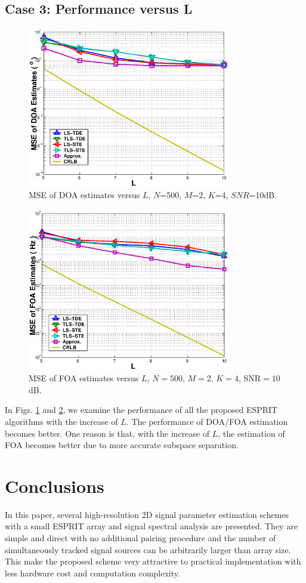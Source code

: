 \documentclass[conference]{IEEEtran}
\begin{document}
\subsection*{Case 3: Performance versus L}
\begin{figure}
\begin{center}
\includegraphics[width=3.5in]{SF_DOAL.eps}
\caption{MSE of DOA estimates versus $L$, $N$=500, $M$=2, $K$=4,
$SNR$=10dB.} \label{SFDOAL}
\end{center}
\end{figure}
\begin{figure}
\begin{center}
\includegraphics[width=3.5in]{SF_FOAL.eps}
\caption{MSE of FOA estimates versus $L$, $N=500$, $M=2$, $K=4$,
$\mbox{SNR}=10$dB.} \label{SFFOAL}
\end{center}
\end{figure}

In Figs. \ref{SFDOAL} and \ref{SFFOAL}, we examine the performance
of all the proposed ESPRIT algorithms with the increase of $L$.
The performance of DOA/FOA estimation becomes better. One reason
is that, with the increase of $L$, the estimation of FOA becomes
better due to more accurate subspace separation.
\section{Conclusions}
In this paper, several high-resolution 2D signal parameter
estimation schemes with a small ESPRIT array and signal spectral
analysis are presented. They are simple and direct with no
additional pairing procedure and the number of simultaneously
tracked signal sources can be arbitrarily larger than array size.
This make the proposed scheme very attractive to practical
implementation with less hardware cost and computation complexity.

\tiny


\end{document}
